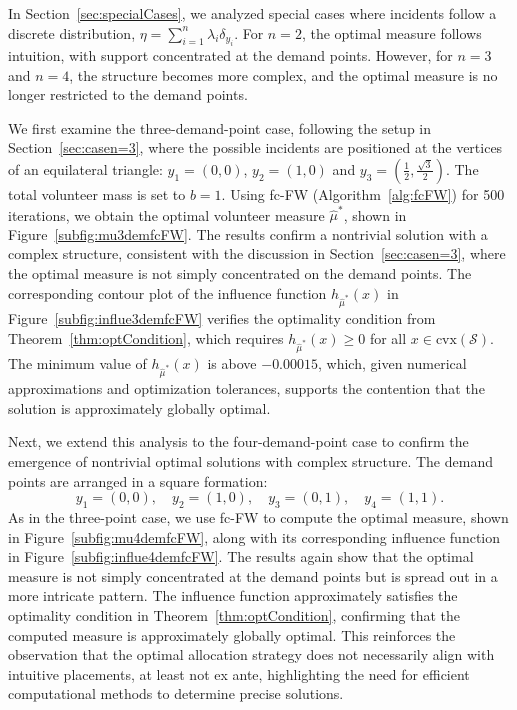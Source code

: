 \documentclass[stsy,sglanonrev]{informs4}
\begin{document}
In Section~\ref{sec:specialCases}, we analyzed special cases where incidents follow a discrete distribution, \( \eta = \sum_{i=1}^{n} \lambda_i \delta_{y_i} \). For \( n = 2 \), the optimal measure follows intuition, with support concentrated at the demand points. However, for \( n = 3 \) and \( n = 4 \), the structure becomes more complex, and the optimal measure is no longer restricted to the demand points.

We first examine the three-demand-point case, following the setup in Section~\ref{sec:casen=3}, where the possible incidents are positioned at the vertices of an equilateral triangle:
$y_1 = (0,0)$, $y_2 = (1,0)$ and $y_3 = \left(\frac{1}{2}, \frac{\sqrt{3}}{2} \right)$. The total volunteer mass is set to \( b = 1 \). Using fc-FW (Algorithm~\ref{alg:fcFW}) for 500 iterations, we obtain the optimal volunteer measure \( \hat{\mu}^* \), shown in Figure~\ref{subfig:mu3demfcFW}. The results confirm a nontrivial solution with a complex structure, consistent with the discussion in Section~\ref{sec:casen=3}, where the optimal measure is not simply concentrated on the demand points. The corresponding contour plot of the influence function \( h_{\hat{\mu}^*}(x) \) in Figure~\ref{subfig:influe3demfcFW} verifies the optimality condition from Theorem~\ref{thm:optCondition}, which requires \( h_{\hat{\mu}^*}(x) \geq 0 \) for all \( x \in \mbox{cvx}(\mathcal{S}) \). The minimum value of \( h_{\hat{\mu}^*}(x) \) is above \(-0.00015\), which, given numerical approximations and optimization tolerances, supports the contention that the solution is approximately globally optimal.

Next, we extend this analysis to the four-demand-point case to confirm the emergence of nontrivial optimal solutions with complex structure. The demand points are arranged in a square formation:
\[
y_1 = (0,0), \quad y_2 = (1,0), \quad y_3 = (0,1), \quad y_4 = (1,1).
\]
As in the three-point case, we use fc-FW to compute the optimal measure, shown in Figure~\ref{subfig:mu4demfcFW}, along with its corresponding influence function in Figure~\ref{subfig:influe4demfcFW}. The results again show that the optimal measure is not simply concentrated at the demand points but is spread out in a more intricate pattern. The influence function approximately satisfies the optimality condition in Theorem~\ref{thm:optCondition}, confirming that the computed measure is approximately globally optimal. This reinforces the observation that the optimal allocation strategy does not necessarily align with intuitive placements, at least not ex ante, highlighting the need for efficient computational methods to determine precise solutions.
\end{document}
